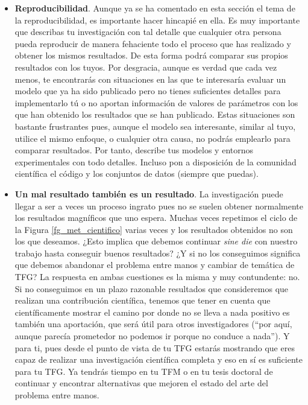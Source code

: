 \begin{itemize}
    \item \textbf{Reproducibilidad}. Aunque ya se ha comentado en esta sección el tema de la reproducibilidad, es importante hacer hincapié en ella. Es muy importante que describas tu investigación con tal detalle que cualquier otra persona pueda reproducir de manera fehaciente todo el proceso que has realizado y obtener los mismos resultados. De esta forma podrá comparar sus propios resultados con los tuyos. Por desgracia, aunque es verdad que cada vez menos, te encontrarás con situaciones en las que te interesaría evaluar un modelo que ya ha sido publicado pero no tienes suficientes detalles para implementarlo tú o no aportan información de valores de parámetros con los que han obtenido los resultados que se han publicado. Estas situaciones son bastante frustrantes pues, aunque el modelo sea interesante, similar al tuyo, utilice el mismo enfoque, o cualquier otra causa, no podrás emplearlo para comparar resultados. Por tanto, describe tus modelos y entornos experimentales con todo detalles. Incluso pon a disposición de la comunidad científica el código y los conjuntos de datos (siempre que puedas).

    \item \textbf{Un mal resultado también es un resultado}. La investigación puede llegar a ser a veces un proceso ingrato pues no se suelen obtener normalmente los resultados magníficos que uno espera. Muchas veces repetimos el ciclo de la Figura \ref{fg_met_cientifico} varias veces y los resultados obtenidos no son los que deseamos. ¿Esto implica que debemos continuar \textit{sine die} con nuestro trabajo hasta conseguir buenos resultados? ¿Y si no los conseguimos significa que debemos abandonar el problema entre manos y cambiar de temática de TFG? La respuesta en ambas cuestiones es la misma y muy contundente: no. Si no conseguimos en un plazo razonable resultados que consideremos que realizan una contribución científica, tenemos que tener en cuenta que científicamente mostrar el camino por donde no se lleva a nada positivo es también una aportación, que será útil para otros investigadores (``por aquí, aunque parecía prometedor no podemos ir porque no conduce a nada''). Y para ti, pues desde el punto de vista de tu TFG estarás mostrando que eres capaz de realizar una investigación científica completa y eso en sí es suficiente para tu TFG. Ya tendrás tiempo en tu TFM o en tu tesis doctoral de continuar y encontrar alternativas que mejoren el estado del arte del problema entre manos.


\end{itemize}

